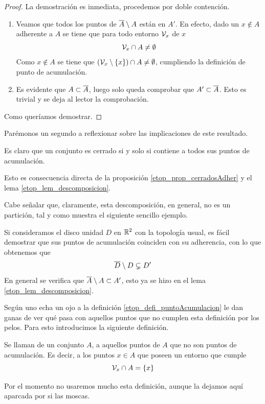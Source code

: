 \begin{proof}
	La demostración es inmediata, procedemos por doble contención.
	\begin{enumerate}
		\item[\bsubset] Veamos que todos los puntos de $\overline{A}\setminus A$ están en $A'$. En efecto, dado un $x\not\in A$ adherente a $A$ se tiene que para todo entorno $\mathcal{V}_x$ de $x$
		\begin{equation*}
		\mathcal{V}_x\cap A\not=\emptyset
		\end{equation*}
		Como $x\not\in A$ se tiene que $(\mathcal{V}_x\setminus\{x\})\cap A\not=\emptyset$, cumpliendo la definición de punto de acumulación.
		\item[\bsupset] Es evidente que $A\subset\overline{A}$, luego solo queda comprobar que $A'\subset \overline{A}$. Esto es trivial y se deja al lector la comprobación.
	\end{enumerate}
	Como queríamos demostrar.
\end{proof}
Parémonos un segundo a reflexionar sobre las implicaciones de este resultado.
\begin{obs}
	Es claro que un conjunto es cerrado si y solo si contiene a todos sus puntos de acumulación.
	
	Esto es consecuencia directa de la proposición \ref{etop_prop_cerradosAdher} y el lema \ref{etop_lem_descomposicion}.
\end{obs}
Cabe señalar que, claramente, esta descomposición, en general, no es un partición, tal y como muestra el siguiente sencillo ejemplo.
\begin{exa}[Disco]
	Si consideramos el disco unidad $D$ en $\mathbb{R}^2$ con la topología usual, es fácil demostrar que sus puntos de acumulación coinciden con su adherencia, con lo que obtenemos que
	\begin{equation}
	\overline{D}\setminus D \subsetneq D'
	\end{equation}
	En general se verifica que $\overline{A}\setminus A\subset A'$, esto ya se hizo en el lema \ref{etop_lem_descomposicion}.
\end{exa}
Según uno echa un ojo a la definición \ref{etop_defi_puntoAcumulacion} le dan ganas de ver qué pasa con aquellos puntos que no cumplen esta definición por los pelos. Para esto introducimos la siguiente definición.
\begin{defi}
	Se llaman  de un conjunto $A$, a aquellos puntos de $A$ que no son puntos de acumulación. Es decir, a los puntos $x\in A$ que poseen un entorno que cumple
	\begin{equation*}
	\mathcal{V}_x\cap A = \{x\}
	\end{equation*}
\end{defi}
Por el momento no usaremos mucho esta definición, aunque la dejamos aquí aparcada por si las moscas.

